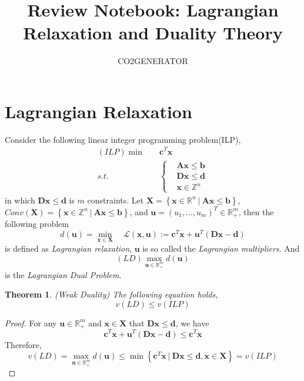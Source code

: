 \documentclass{article}
\title {Review Notebook: Lagrangian Relaxation and Duality Theory}
\author{CO2GENERATOR}
\newtheorem{thm}{Theorem}
\begin{document}
\maketitle 
\allowdisplaybreaks[4]

\section{Lagrangian Relaxation}
 
Consider the following linear integer programming problem(ILP),
\begin{align}
	(\textit{ILP}) \min \quad & \bm{c}^T\bm{x} \\
	s.t. \quad & \left\{\begin{aligned}
	& \bm{A}\bm{x} \leq \bm{b} \\
	& \bm{D}\bm{x} \leq \bm{d} \\
	& \bm{x} \in \mathbb{Z}^n
	\end{aligned} \right.
\end{align}
in which $\bm{D} \bm{x} \leq \bm{d}$ is $m$ constraints. Let $\bm{X}= \left\{\bm{x} \in \mathbb{R}^n \ | \ \bm{A}\bm{x} \leq \bm{b}\right\}$, $Conv(\bm{X}) = \left\{\bm{x} \in \mathbb{Z}^n \ | \ \bm{A}\bm{x} \leq \bm{b}\right\}$, and $\bm{u} = (u_1, ..., u_m)^T \in \mathbb{R}_+^m$, then the following problem
\begin{equation}
	 d(\bm{u}) = \min_{\bm{x} \in \bm{X}} \quad \mathcal{L}(\bm{x}, \bm{u}) := \bm{c}^T\bm{x} + \bm{u}^T(\bm{D}\bm{x} - \bm{d}) 
\end{equation}
 is defined as \textit{Lagrangian relaxation}, $\bm{u}$ is so called the \textit{Lagrangian multipliers}. And 
 \begin{equation}
 	(\textit{LD}) \max_{\bm{u} \in \mathbb{R}_+^m}d(\bm{u})
 \end{equation}
 is the \textit{Lagrangian Dual Problem}.
 
 \begin{thm} 
 	(Weak Duality) The following equation holds,
 	\begin{equation}
 		v(LD) \leq v(ILP)
 	\end{equation}
 \end{thm}

\begin{proof}
	For any $\bm{u} \in \mathbb{R}_+^m$ and $\bm{x} \in \bm{X}$ that $\bm{Dx} \leq \bm{d}$, we have
	\begin{equation}
		\bm{c}^T \bm{x} + \bm{u}^T (\bm{Dx} - \bm{d}) \leq \bm{c}^T\bm{x}
	\end{equation}
	Therefore,
	\begin{equation}
		v(LD) = \max_{\bm{u} \in \mathbb{R}_+^m} d(\bm{u}) \leq \min \left\{\bm{c}^T\bm{x} \ | \ \bm{D}\bm{x} \leq \bm{d}, \bm{x} \in \bm{X}\right\} = v(ILP)
	\end{equation}
\end{proof}
\end{document}
